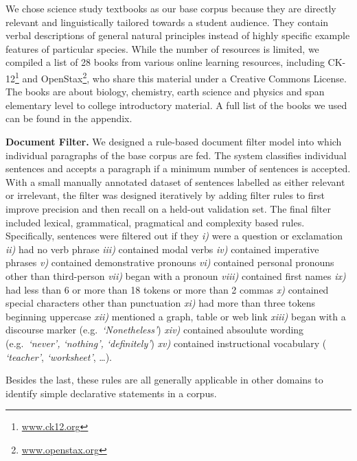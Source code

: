 We chose science study textbooks as our base corpus because they are directly relevant and linguistically tailored towards a student audience. They contain verbal descriptions of general natural principles instead of highly specific example features of particular species. While the number of resources is limited, we compiled a list of 28 books from various online learning resources, including CK-12\footnote{\url{www.ck12.org}} and
OpenStax\footnote{\url{www.openstax.org}}, who share this material under a Creative Commons License. The books are about biology, chemistry, earth science and physics and span elementary level to college introductory material. A full list of the books we used can be found in the appendix. 

\textbf{Document Filter.} We designed a rule-based document filter model into which individual paragraphs of the base corpus are fed. The system classifies individual sentences and accepts a paragraph if a minimum number of sentences is accepted. With a small manually annotated dataset of sentences labelled as either relevant or irrelevant, the filter was designed iteratively by adding filter rules to first improve precision and then recall on a held-out validation set. The final filter included lexical, grammatical, pragmatical and complexity based rules. Specifically, sentences were filtered out if they \emph{i)} were a question or exclamation \emph{ii)} had no verb phrase \emph{iii)} contained modal verbs \emph{iv)} contained imperative phrases \emph{v)} contained demonstrative pronouns \emph{vi)} contained personal pronouns other than third-person \emph{vii)} began with a pronoun \emph{viii)} contained first names \emph{ix)} had less than 6 or more than 18 tokens or more than 2 commas \emph{x)} contained special characters other than punctuation \emph{xi)} had more than three tokens beginning uppercase \emph{xii)} mentioned a graph, table or web link \emph{xiii)} began with a discourse marker (e.g.~\emph{`Nonetheless'})  \emph{xiv)} contained absoulute wording (e.g.~\emph{`never', `nothing', `definitely'}) \emph{xv)} contained instructional vocabulary ( \emph{`teacher'}, \emph{`worksheet'}, \dots).

Besides the last, these rules are all generally applicable in other domains to identify simple declarative statements in a corpus.

